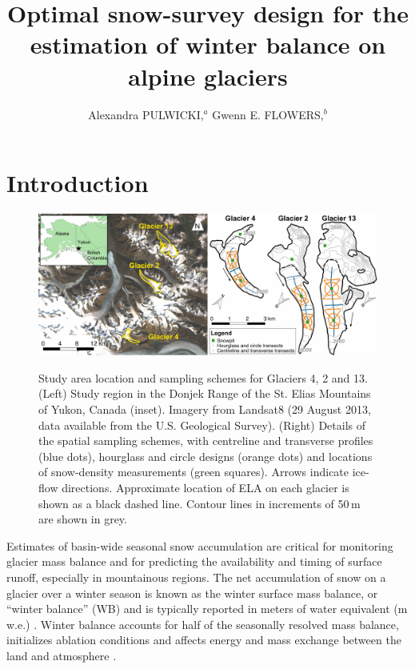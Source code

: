 \documentclass{article}
\title{Optimal snow-survey design for the estimation of winter balance on alpine glaciers}
\author{Alexandra PULWICKI,$^a$
  Gwenn E. FLOWERS,$^b$}
\affiliation{Simon Fraser University}
\begin{document}
\maketitle

\section{Introduction}

\begin{figure}
	\centering
	\includegraphics[width =\textwidth]{PaperII-StudySite.pdf}\\
	\caption{Study area location and sampling schemes for Glaciers 4, 2 and 13. (Left) Study region in the Donjek Range of the St. Elias Mountains of Yukon, Canada (inset). Imagery from Landsat8 (29 August 2013, data available from the U.S. Geological Survey). (Right) Details of the spatial sampling schemes, with centreline and transverse profiles (blue dots), hourglass and circle designs (orange dots) and locations of snow-density measurements (green squares). Arrows indicate ice-flow directions. Approximate location of ELA on each glacier is shown as a black dashed line. Contour lines in increments of 50\,m are shown in grey.}
	\label{fig:Sampling}
\end{figure} 

Estimates of basin-wide seasonal snow accumulation are critical for monitoring glacier mass balance and for predicting the availability and timing of surface runoff, especially in mountainous regions. The net accumulation of snow on a glacier over a winter season is known as the winter surface mass balance, or ``winter balance'' (WB) and is typically reported in meters of water equivalent (m\,w.e.)  \parencite{Cogley2011}. Winter balance accounts for half of the seasonally resolved mass balance, initializes ablation conditions and affects energy and mass exchange between the land and atmosphere  \parencite[e.g.][]{Hock2005, Reveillet2016}. 
\end{document}
